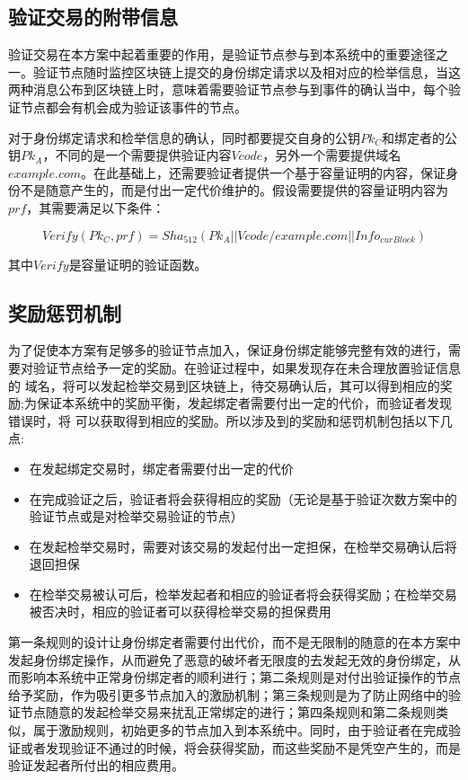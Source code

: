 \subsection{验证交易的附带信息}

验证交易在本方案中起着重要的作用，是验证节点参与到本系统中的重要途径之一。验证节点随时监控区块链上提交的身份绑定请求以及相对应的检举信息，当这两种消息公布到区块链上时，意味着需要验证节点参与到事件的确认当中，每个验证节点都会有机会成为验证该事件的节点。

对于身份绑定请求和检举信息的确认，同时都要提交自身的公钥$Pk_C$和绑定者的公钥$Pk_A$，不同的是一个需要提供验证内容$Vcode$，另外一个需要提供域名$example.com$。在此基础上，还需要验证者提供一个基于容量证明的内容，保证身份不是随意产生的，而是付出一定代价维护的。假设需要提供的容量证明内容为$prf$，其需要满足以下条件：

\begin{equation}\label{pocVerify}
Verify(Pk_C, prf) = Sha_{512}(Pk_A||Vcode/example.com||Info_{curBlock})
\end{equation}

其中$Verify$是容量证明的验证函数。



\subsection{奖励惩罚机制}

为了促使本方案有足够多的验证节点加入，保证身份绑定能够完整有效的进行，需要对验证节点给予一定的奖励。在验证过程中，如果发现存在未合理放置验证信息的 域名，将可以发起检举交易到区块链上，待交易确认后，其可以得到相应的奖励;为保证本系统中的奖励平衡，发起绑定者需要付出一定的代价，而验证者发现错误时，将 可以获取得到相应的奖励。所以涉及到的奖励和惩罚机制包括以下几点:

\begin{itemize}
	\item 在发起绑定交易时，绑定者需要付出一定的代价
	\item 在完成验证之后，验证者将会获得相应的奖励（无论是基于验证次数方案中的验证节点或是对检举交易验证的节点）
	\item 在发起检举交易时，需要对该交易的发起付出一定担保，在检举交易确认后将退回担保
	\item 在检举交易被认可后，检举发起者和相应的验证者将会获得奖励；在检举交易被否决时，相应的验证者可以获得检举交易的担保费用
\end{itemize}

第一条规则的设计让身份绑定者需要付出代价，而不是无限制的随意的在本方案中发起身份绑定操作，从而避免了恶意的破坏者无限度的去发起无效的身份绑定，从而影响本系统中正常身份绑定者的顺利进行；第二条规则是对付出验证操作的节点给予奖励，作为吸引更多节点加入的激励机制；第三条规则是为了防止网络中的验证节点随意的发起检举交易来扰乱正常绑定的进行；第四条规则和第二条规则类似，属于激励规则，初始更多的节点加入到本系统中。同时，由于验证者在完成验证或者发现验证不通过的时候，将会获得奖励，而这些奖励不是凭空产生的，而是验证发起者所付出的相应费用。





